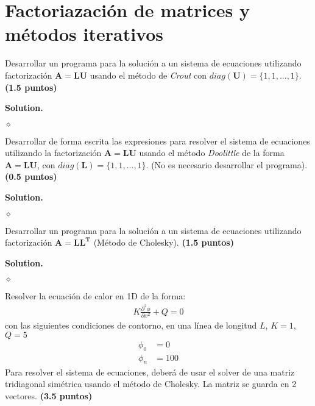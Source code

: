 \documentclass{article}
\theoremstyle{problemstyle}
\newenvironment{solution}{%
  \begin{mdframed}[linewidth=0.8pt,linecolor=Gray,backgroundcolor=Gray!5,roundcorner=5pt]%
  \noindent\textbf{Solution.}%
}{%
\hfill $ \diamond $ 
  \end{mdframed}%
}
\begin{document}
\section*{Factoriazaci\'on de matrices y m\'etodos iterativos}\label{sec:factoriazaci_on_de_matrices_y_m_etodos_iterativos} %


\begin{problem}
Desarrollar un programa para la soluci\'on a un sistema de ecuaciones utilizando factorizaci\'on $ \mathbf{A} = \mathbf{LU} $ usando el método de \textit{Crout} con $diag(\mathbf{U}) = \{1, 1, . . . , 1\}$. \textbf{(1.5 puntos)}
\end{problem}

\begin{solution}
\end{solution}

\begin{problem}
  Desarrollar de forma escrita las expresiones para resolver el sistema de ecuaciones utilizando la factorizaci\'on $ \mathbf{A} = \mathbf{LU} $ usando el m\'etodo \textit{Doolittle} de la forma $ \mathbf{A} = \mathbf{LU} $, con $diag(\mathbf{L}) = \{1, 1, . . . , 1\}$. (No es necesario desarrollar el programa).\textbf{(0.5 puntos)}
\end{problem}

\begin{solution}
\end{solution}

\begin{problem}
  Desarrollar un programa para la soluci\'on a un sistema de ecuaciones utilizando factorizaci\'on $ \mathbf{A} = \mathbf{LL^T} $ (M\'etodo de Cholesky). \textbf{(1.5 puntos)}
\end{problem}

\begin{solution}
\end{solution}

\begin{problem}
  Resolver la ecuaci\'on de calor en 1D de la forma:
  \begin{align*}
    K \frac{\partial^2\phi}{\partial x^2} + Q = 0
  \end{align*}
  con las siguientes condiciones de contorno, en una l\'inea de longitud $ L$, $ K = 1 $, $ Q = 5 $
  \begin{align*}
    \phi_0 &= 0\\
    \phi_n &= 100
  \end{align*}
  Para resolver el sistema de ecuaciones, deber\'a de usar el solver de una matriz tridiagonal sim\'etrica usando el m\'etodo de Cholesky. La matriz se guarda en 2 vectores. \textbf{(3.5 puntos)}

\end{problem}
\end{document}
